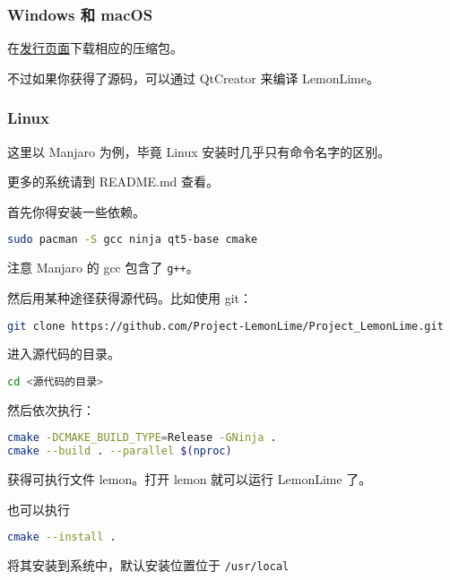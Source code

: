 \documentclass[UTF-8]{ctexart}
\begin{document}
    \subsubsection{Windows 和 macOS}

    在\href{https://github.com/Project-LemonLime/Project_LemonLime/releases}{发行页面}下载相应的压缩包。

    不过如果你获得了源码，可以通过 QtCreator 来编译 LemonLime。

    \subsubsection{Linux}

    这里以 Manjaro 为例，毕竟 Linux 安装时几乎只有命令名字的区别。

    更多的系统请到 README.md 查看。

    首先你得安装一些依赖。

    \begin{lstlisting}[language=bash,frame=shadowbox,basicstyle=\ttfamily]
sudo pacman -S gcc ninja qt5-base cmake
    \end{lstlisting}

    注意 Manjaro 的 gcc 包含了 \texttt{g++}。

    然后用某种途径获得源代码。比如使用 git：

    \begin{lstlisting}[language=bash,frame=shadowbox,basicstyle=\ttfamily]
git clone https://github.com/Project-LemonLime/Project_LemonLime.git
    \end{lstlisting}

    进入源代码的目录。

    \begin{lstlisting}[language=bash,frame=shadowbox,basicstyle=\ttfamily]
cd <源代码的目录>
    \end{lstlisting}

    然后依次执行：

    \begin{lstlisting}[language=bash,frame=shadowbox,basicstyle=\ttfamily]
cmake -DCMAKE_BUILD_TYPE=Release -GNinja .
cmake --build . --parallel $(nproc)
    \end{lstlisting}

    获得可执行文件 lemon。打开 lemon 就可以运行 LemonLime 了。

    也可以执行

    \begin{lstlisting}[language=bash,frame=shadowbox,basicstyle=\ttfamily]
cmake --install .
    \end{lstlisting}
    将其安装到系统中，默认安装位置位于 \verb|/usr/local|
\end{document}
